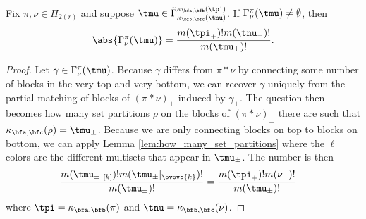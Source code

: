 \begin{lemma}\label{lem:size_of_gamma} Fix $\pi,\nu\in \Pi_{2(r)}$ and suppose $\tmu\in\tilde{\Gamma}^{\kappa_{\bfa,\bfb}(\tpi)}_{\kappa_{\bfb,\bfc}(\tnu)}$. If $\Gamma_\nu^\pi(\tmu)\neq\emptyset$, then \[\abs{\Gamma^\pi_\nu(\tmu)}=\frac{m(\tpi_+)!m(\tnu_-)!}{m(\tmu_\pm)!}.\]
\end{lemma}

\begin{proof} Let $\gamma\in\Gamma_\nu^\pi(\tmu)$. Because $\gamma$ differs from $\pi\ast\nu$ by connecting some number of blocks in the very top and very bottom, we can recover $\gamma$ uniquely from the partial matching of blocks of $(\pi\ast\nu)_\pm$ induced by $\gamma_\pm$. The question then becomes how many set partitions $\rho$ on the blocks of $(\pi\ast\nu)_\pm$ there are such that $\kappa_{\bfa,\bfc}(\rho)=\tmu_\pm$. Because we are only connecting blocks on top to blocks on bottom, we can apply Lemma \ref{lem:how_many_set_partitions} where the $\ell$ colors are the different multisets that appear in $\tmu_\pm$. The number is then \begin{align*}
    \frac{m(\tmu_\pm|_{[k]})!m(\tmu_\pm|_{\ovovb{k}})!}{m(\tmu_\pm)!}&=\frac{m(\tpi_+)!m(\nu_-)!}{m(\tmu_\pm)!}
\end{align*} where $\tpi=\kappa_{\bfa,\bfb}(\pi)$ and $\tnu=\kappa_{\bfb,\bfc}(\nu)$.
\end{proof}

